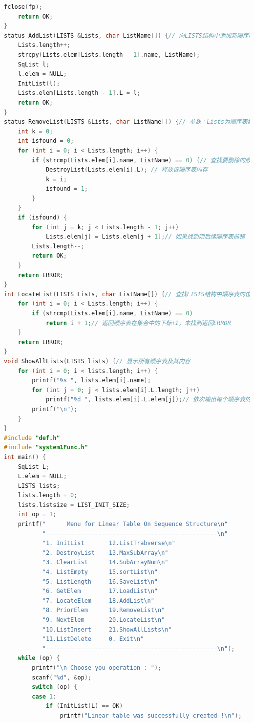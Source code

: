 \documentclass[supercite]{Experimental_Report}
\theoremstyle{definition}
\begin{document}
\begin{lstlisting}[language=c]
    fclose(fp);
    return OK;
}
status AddList(LISTS &Lists, char ListName[]) {// 向LISTS结构中添加新顺序表
    Lists.length++;
    strcpy(Lists.elem[Lists.length - 1].name, ListName);
    SqList l;
    l.elem = NULL;
    InitList(l);
    Lists.elem[Lists.length - 1].L = l;
    return OK;
}
status RemoveList(LISTS &Lists, char ListName[]) {// 参数：Lists为顺序表集合，ListName为要移除的顺序表名
    int k = 0;
    int isfound = 0;
    for (int i = 0; i < Lists.length; i++) {
        if (strcmp(Lists.elem[i].name, ListName) == 0) {// 查找要删除的顺序表
            DestroyList(Lists.elem[i].L); // 释放该顺序表内存
            k = i;
            isfound = 1;
        }
    }
    if (isfound) {
        for (int j = k; j < Lists.length - 1; j++)
            Lists.elem[j] = Lists.elem[j + 1];// 如果找到则后续顺序表前移
        Lists.length--;
        return OK;
    }
    return ERROR;
}
int LocateList(LISTS Lists, char ListName[]) {// 查找LISTS结构中顺序表的位置
    for (int i = 0; i < Lists.length; i++) {
        if (strcmp(Lists.elem[i].name, ListName) == 0)
            return i + 1;// 返回顺序表在集合中的下标+1，未找到返回ERROR
    }
    return ERROR;
}
void ShowAllLists(LISTS lists) {// 显示所有顺序表及其内容
    for (int i = 0; i < lists.length; i++) {
        printf("%s ", lists.elem[i].name);
        for (int j = 0; j < lists.elem[i].L.length; j++)
            printf("%d ", lists.elem[i].L.elem[j]);// 依次输出每个顺序表的名字和所有元素
        printf("\n");
    }
}
#include "def.h"
#include "system1Func.h"
int main() {
    SqList L;
    L.elem = NULL;
    LISTS lists;
    lists.length = 0;
    lists.listsize = LIST_INIT_SIZE;
    int op = 1;
    printf("      Menu for Linear Table On Sequence Structure\n"
           "-------------------------------------------------\n"
           "1. InitList       12.ListTrabverse\n"
           "2. DestroyList    13.MaxSubArray\n"
           "3. ClearList      14.SubArrayNum\n"
           "4. ListEmpty      15.sortList\n"
           "5. ListLength     16.SaveList\n"
           "6. GetElem        17.LoadList\n"
           "7. LocateElem     18.AddList\n"
           "8. PriorElem      19.RemoveList\n"
           "9. NextElem       20.LocateList\n"
           "10.ListInsert     21.ShowAllLists\n"
           "11.ListDelete     0. Exit\n"
           "-------------------------------------------------\n");
    while (op) {
        printf("\n Choose you operation : ");
        scanf("%d", &op);
        switch (op) {
        case 1:
            if (InitList(L) == OK)
                printf("Linear table was successfully created !\n");

\end{lstlisting}
\end{document}
